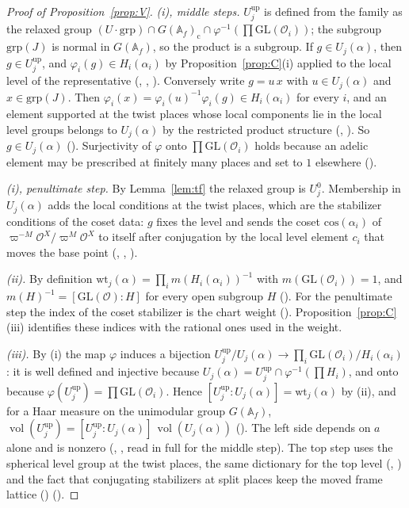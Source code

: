 \documentclass[11pt]{article}
\newcommand{\Ok}{\mathcal O}
\newcommand{\GL}{\mathrm{GL}}
\newcommand{\vol}{\operatorname{vol}}
\newcommand{\Af}{\mathbb A_{f}}
\theoremstyle{definition}
\theoremstyle{remark}
\begin{document}
\begin{proof}[Proof of Proposition~\ref{prop:V}]
\emph{(i), middle steps.} $U^{\mathrm{up}}_j$ is defined from the family as the relaxed group $(U\cdot\mathrm{grp})\cap G(\Af)_{\mathrm c}\cap\varphi^{-1}(\prod\GL(\Ok_i))$; the subgroup $\mathrm{grp}(J)$ is normal in $G(\Af)$, so the product is a subgroup. If $g\in U_j(\alpha)$, then $g\in U^{\mathrm{up}}_j$, and $\varphi_i(g)\in H_i(\alpha_i)$ by Proposition~\ref{prop:C}(i) applied to the local level of the representative (, , ). Conversely write $g=u\,x$ with $u\in U_j(\alpha)$ and $x\in\mathrm{grp}(J)$. Then $\varphi_i(x)=\varphi_i(u)^{-1}\varphi_i(g)\in H_i(\alpha_i)$ for every $i$, and an element supported at the twist places whose local components lie in the local level groups belongs to $U_j(\alpha)$ by the restricted product structure (, ). So $g\in U_j(\alpha)$ (). Surjectivity of $\varphi$ onto $\prod\GL(\Ok_i)$ holds because an adelic element may be prescribed at finitely many places and set to $1$ elsewhere ().

\emph{(i), penultimate step.} By Lemma~\ref{lem:tf} the relaxed group is $U^0_j$. Membership in $U_j(\alpha)$ adds the local conditions at the twist places, which are the stabilizer conditions of the coset data: $g$ fixes the level and sends the coset $\mathrm{cos}(\alpha_i)$ of $\varpi^{-M}\Ok^{X}/\varpi^{M}\Ok^{X}$ to itself after conjugation by the local level element $c_i$ that moves the base point (, , ).

\emph{(ii).} By definition $\mathrm{wt}_j(\alpha)=\prod_i m(H_i(\alpha_i))^{-1}$ with $m(\GL(\Ok_i))=1$, and $m(H)^{-1}=[\GL(\Ok):H]$ for every open subgroup $H$ (). For the penultimate step the index of the coset stabilizer is the chart weight (). Proposition~\ref{prop:C}(iii) identifies these indices with the rational ones used in the weight.

\emph{(iii).} By (i) the map $\varphi$ induces a bijection $U^{\mathrm{up}}_j/U_j(\alpha)\to\prod_i\GL(\Ok_i)/H_i(\alpha_i)$: it is well defined and injective because $U_j(\alpha)=U^{\mathrm{up}}_j\cap\varphi^{-1}(\prod H_i)$, and onto because $\varphi(U^{\mathrm{up}}_j)=\prod\GL(\Ok_i)$. Hence $[U^{\mathrm{up}}_j:U_j(\alpha)]=\mathrm{wt}_j(\alpha)$ by (ii), and for a Haar measure on the unimodular group $G(\Af)$, $\vol(U^{\mathrm{up}}_j)=[U^{\mathrm{up}}_j:U_j(\alpha)]\,\vol(U_j(\alpha))$ (). The left side depends on $a$ alone and is nonzero (, , read in full for the middle step). The top step uses the spherical level group at the twist places, the same dictionary for the top level (, ) and the fact that conjugating stabilizers at split places keep the moved frame lattice () ().
\end{proof}
\end{document}
